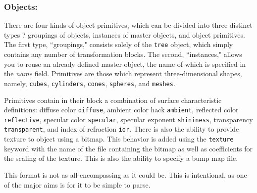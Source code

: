\documentclass{scrartcl}
\begin{document}
\subsubsection*{Objects:}
There are four kinds of object primitives, which can be divided into three distinct types ? groupings of
objects, instances of master objects, and object primitives. The first type, ``groupings," consists solely of the
\texttt{tree} object, which simply contains any number of transformation blocks. The second, ``instances," allows
you to reuse an already defined master object, the name of which is specified in the \emph{name} field. Primitives
are those which represent three-dimensional shapes, namely, \texttt{cubes}, \texttt{cylinders}, \texttt{cones}, \texttt{spheres}, and \texttt{meshes}.

Primitives contain in their block a combination of surface characteristic definitions: diffuse color \texttt{diffuse},
ambient color hack \texttt{ambient}, reflected color \texttt{reflective}, specular color \texttt{specular}, specular exponent \texttt{shininess},
transparency \texttt{transparent}, and index of refraction \texttt{ior}. There is also the ability to provide texture to object
using a bitmap. This behavior is added using the \texttt{texture} keyword with the name of the file containing the
bitmap as well as coefficients for the scaling of the texture. This is also the ability to specify a bump map
file.

This format is not as all-encompassing as it could be. This is intentional, as one of the major aims is for
it to be simple to parse.
\end{document}
